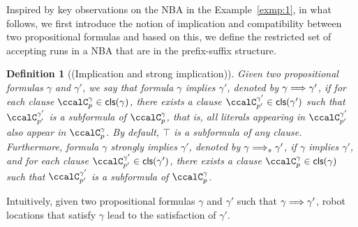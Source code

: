 \documentclass[Afour,sageh,times]{sagej}
\newtheorem{defn}[thm]{Definition}
\newcommand{\clause}[1]{\mathsf{cls}(#1)}
\newcommand{\simplies}{\DOTSB\Longrightarrow}
\begin{document}
 Inspired by key observations on the NBA in the Example~\ref{exmp:1}, in what follows, we first introduce the notion of implication and compatibility between two propositional formulas and based on this, we define the restricted set of accepting runs in a NBA that are in the prefix-suffix structure.
 \begin{defn}[(Implication and strong implication)]\label{defn:implication}
Given two propositional formulas $\gamma$ and $\gamma'$, we say that formula  $\gamma$ implies $\gamma'$, denoted by $\gamma \simplies \gamma'$, if for each clause $\ccalC_{p}^{\gamma} \in \clause{\gamma}$, there exists a clause $\ccalC_{p'}^{\gamma'} \in \clause{\gamma'}$ such that  $\ccalC_{p'}^{\gamma'}$ is a subformula of $\ccalC_{p}^{\gamma}$, that is, all literals appearing in $\ccalC_{p'}^{\gamma'}$ also appear in $\ccalC_{p}^{\gamma}$. By default, $\top$ is a subformula of any clause. Furthermore, formula $\gamma$ strongly implies $\gamma'$, denoted by $\gamma \simplies_s  \gamma'$, if $\gamma$ implies $\gamma'$, and for each clause $\ccalC_{p'}^{\gamma'} \in \clause{\gamma'}$, there exists a clause $\ccalC_{p}^{\gamma} \in \clause{\gamma}$ such that  $\ccalC_{p'}^{\gamma'}$ is a subformula of $\ccalC_{p}^{\gamma}$.
 \end{defn}

 Intuitively, given two propositional formulas $\gamma$ and $\gamma'$ such that $\gamma \simplies \gamma'$, robot locations that satisfy $\gamma$ lead to the satisfaction of $\gamma'$. %
\end{document}
